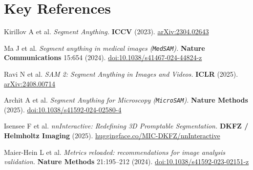 \documentclass[10.5pt,a4paper]{article}
\begin{document}
\section*{Key References}
\small
\begin{enumerate}[label={[\arabic*]}]
    \item Kirillov A et al. \emph{Segment Anything.} \textbf{ICCV} (2023). \href{https://arxiv.org/abs/2304.02643}{arXiv:2304.02643}
    \item Ma J et al. \emph{Segment anything in medical images (\texttt{MedSAM}).} \textbf{Nature Communications} 15:654 (2024). \href{https://doi.org/10.1038/s41467-024-44824-z}{doi:10.1038/s41467-024-44824-z}
    \item Ravi N et al. \emph{SAM 2: Segment Anything in Images and Videos.} \textbf{ICLR} (2025). \href{https://arxiv.org/abs/2408.00714}{arXiv:2408.00714}
    \item Archit A et al. \emph{Segment Anything for Microscopy (\texttt{MicroSAM}).} \textbf{Nature Methods} (2025). \href{https://doi.org/10.1038/s41592-024-02580-4}{doi:10.1038/s41592-024-02580-4}
    \item Isensee F et al. \emph{nnInteractive: Redefining 3D Promptable Segmentation.} \textbf{DKFZ / Helmholtz Imaging} (2025). \href{https://huggingface.co/MIC-DKFZ/nnInteractive}{huggingface.co/MIC-DKFZ/nnInteractive}
    \item Maier-Hein L et al. \emph{Metrics reloaded: recommendations for image analysis validation.} \textbf{Nature Methods} 21:195--212 (2024). \href{https://doi.org/10.1038/s41592-023-02151-z}{doi:10.1038/s41592-023-02151-z}
\end{enumerate}
\end{document}
